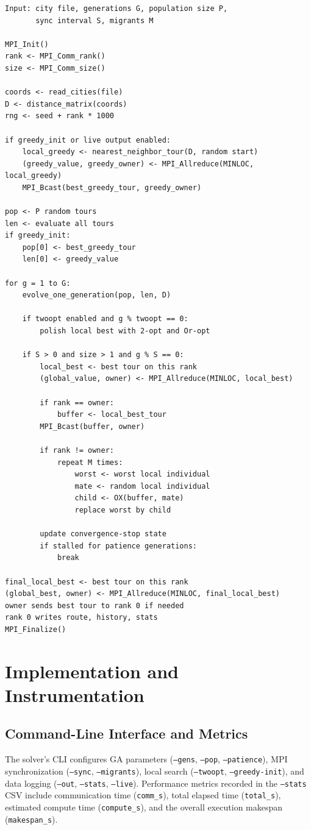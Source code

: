 \documentclass[11pt,a4paper]{article}
\begin{document}
\begin{lstlisting}[language={},caption={Island-model GA with partial global-best migration}]
Input: city file, generations G, population size P,
       sync interval S, migrants M

MPI_Init()
rank <- MPI_Comm_rank()
size <- MPI_Comm_size()

coords <- read_cities(file)
D <- distance_matrix(coords)
rng <- seed + rank * 1000

if greedy_init or live output enabled:
    local_greedy <- nearest_neighbor_tour(D, random start)
    (greedy_value, greedy_owner) <- MPI_Allreduce(MINLOC, local_greedy)
    MPI_Bcast(best_greedy_tour, greedy_owner)

pop <- P random tours
len <- evaluate all tours
if greedy_init:
    pop[0] <- best_greedy_tour
    len[0] <- greedy_value

for g = 1 to G:
    evolve_one_generation(pop, len, D)

    if twoopt enabled and g % twoopt == 0:
        polish local best with 2-opt and Or-opt

    if S > 0 and size > 1 and g % S == 0:
        local_best <- best tour on this rank
        (global_value, owner) <- MPI_Allreduce(MINLOC, local_best)

        if rank == owner:
            buffer <- local_best_tour
        MPI_Bcast(buffer, owner)

        if rank != owner:
            repeat M times:
                worst <- worst local individual
                mate <- random local individual
                child <- OX(buffer, mate)
                replace worst by child

        update convergence-stop state
        if stalled for patience generations:
            break

final_local_best <- best tour on this rank
(global_best, owner) <- MPI_Allreduce(MINLOC, final_local_best)
owner sends best tour to rank 0 if needed
rank 0 writes route, history, stats
MPI_Finalize()
\end{lstlisting}
\newpage

\section{Implementation and Instrumentation}

\subsection{Command-Line Interface and Metrics}
The solver's CLI configures GA parameters (\texttt{--gens}, \texttt{--pop}, \texttt{--patience}), MPI synchronization (\texttt{--sync}, \texttt{--migrants}), local search (\texttt{--twoopt}, \texttt{--greedy-init}), and data logging (\texttt{--out}, \texttt{--stats}, \texttt{--live}). Performance metrics recorded in the \texttt{--stats} CSV include communication time (\texttt{comm\_s}), total elapsed time (\texttt{total\_s}), estimated compute time (\texttt{compute\_s}), and the overall execution makespan (\texttt{makespan\_s}).
\end{document}
